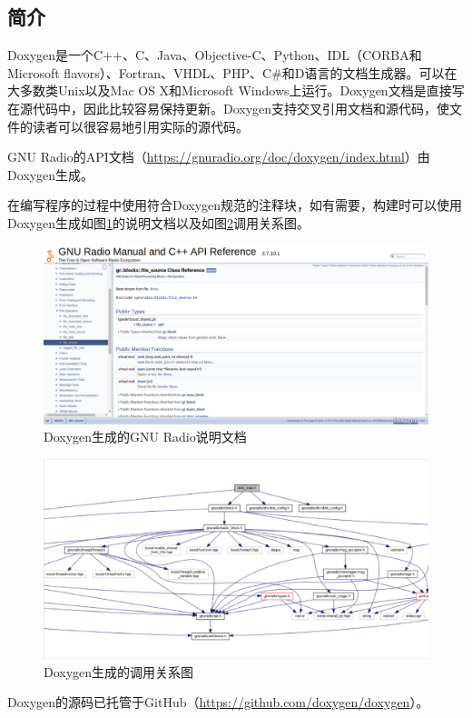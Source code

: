 		\subsection{简介}
			\par Doxygen是一个C++、C、Java、Objective-C、Python、IDL（CORBA和Microsoft flavors）、Fortran、VHDL、PHP、C\#和D语言的文档生成器。可以在大多数类Unix以及Mac OS X和Microsoft Windows上运行。Doxygen文档是直接写在源代码中，因此比较容易保持更新。Doxygen支持交叉引用文档和源代码，使文件的读者可以很容易地引用实际的源代码。
			\par GNU Radio的API文档（\href{https://gnuradio.org/doc/doxygen/index.html}{https://gnuradio.org/doc/doxygen/index.html}）由Doxygen生成。
			\par 在编写程序的过程中使用符合Doxygen规范的注释块，如有需要，构建时可以使用Doxygen生成如图\ref{fig:doxygen_gnuradio}的说明文档以及如图\ref{fig:doxygen_dvbt_map}调用关系图。
			\begin{figure}[htbp]
				\centering
				\includegraphics[width=13cm]{figures/doxygen_gnuradio.png}
				\caption{Doxygen生成的GNU Radio说明文档}
				\label{fig:doxygen_gnuradio}
			\end{figure}
			\begin{figure}[htbp]
				\centering
				\includegraphics[width=13cm]{figures/doxygen_dvbt_map.png}
				\caption{Doxygen生成的调用关系图}
				\label{fig:doxygen_dvbt_map}
			\end{figure}
			\par Doxygen的源码已托管于GitHub（\href{https://github.com/doxygen/doxygen}{https://github.com/doxygen/doxygen}）。

